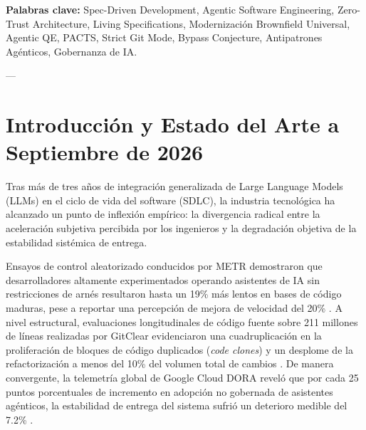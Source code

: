 \documentclass[11pt,a4paper]{article}
\begin{document}
\noindent\textbf{Palabras clave:} Spec-Driven Development, Agentic Software Engineering, Zero-Trust Architecture, Living Specifications, Modernización Brownfield Universal, Agentic QE, PACTS, Strict Git Mode, Bypass Conjecture, Antipatrones Agénticos, Gobernanza de IA.

---

\section{Introducción y Estado del Arte a Septiembre de 2026}

Tras más de tres años de integración generalizada de Large Language Models (LLMs) en el ciclo de vida del software (SDLC), la industria tecnológica ha alcanzado un punto de inflexión empírico: la divergencia radical entre la aceleración subjetiva percibida por los ingenieros y la degradación objetiva de la estabilidad sistémica de entrega.

Ensayos de control aleatorizado conducidos por METR demostraron que desarrolladores altamente experimentados operando asistentes de IA sin restricciones de arnés resultaron hasta un 19\% más lentos en bases de código maduras, pese a reportar una percepción de mejora de velocidad del 20\% \cite{metr2025}. A nivel estructural, evaluaciones longitudinales de código fuente sobre 211 millones de líneas realizadas por GitClear evidenciaron una cuadruplicación en la proliferación de bloques de código duplicados (\textit{code clones}) y un desplome de la refactorización a menos del 10\% del volumen total de cambios \cite{gitclear2025}. De manera convergente, la telemetría global de Google Cloud DORA reveló que por cada 25 puntos porcentuales de incremento en adopción no gobernada de asistentes agénticos, la estabilidad de entrega del sistema sufrió un deterioro medible del 7.2\% \cite{dora2024}.
\end{document}
